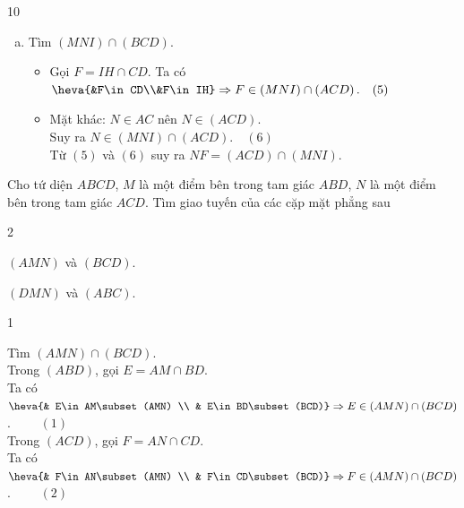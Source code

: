 \begin{indapan}{10}
\begin{bt}
{\begin{enumerate}[a)]
				\begin{itemize}
					\item Gọi $E=IH\cap BD$. Ta có $\heva{&E\in BD\\&E\in IH}\Rightarrow E\in \left(MNI\right)\cap\left(ABD\right).\quad (3)$
					\item Dễ thấy $M\in \left(ABD\right)\cap\left(MNI\right).\quad (4)$
				\end{itemize}
				Từ $(3)$ và $(4)$ suy ra $ME=\left(ABD\right)\cap\left(MNI\right)$.
		\item Tìm $(MNI) \cap (BCD)$.
			\begin{itemize}
				\item Gọi $F=IH\cap CD$. Ta có $\heva{&F\in CD\\&F\in IH}\Rightarrow F\in \left(MNI\right)\cap\left(ACD\right).\quad (5)$
				\item Mặt khác: $N\in AC$ nên $N\in \left(ACD\right)$.\\
				Suy ra $N\in \left(MNI\right)\cap\left(ACD\right).\quad (6)$\\
				Từ $(5)$ và $(6)$ suy ra $NF=\left(ACD\right)\cap\left(MNI\right)$.
			\end{itemize}
	\end{enumerate}
	}
\end{bt}
\begin{bt}%
	Cho tứ diện $ABCD$, $M$ là một điểm bên trong tam giác $ABD$, $N$ là một điểm bên trong tam giác $ACD$. Tìm giao tuyến của các cặp mặt phẳng sau
	\begin{enumEX}[]{2}
		\item $(AMN)$ và $(BCD)$.
		\item $(DMN)$ và $(ABC)$.
	\end{enumEX}
	\loigiai
	{
	\immini
	{
		\begin{enumEX}[a)]{1}
			\item Tìm $(AMN)\cap (BCD)$.\\
				Trong $(ABD)$, gọi $E=AM\cap BD$.\\
				Ta có $\heva{& E\in AM\subset (AMN) \\ & E\in BD\subset (BCD)}\Rightarrow E\in (AMN)\cap (BCD)$. $\qquad (1)$\\
				Trong $(ACD)$, gọi $F=AN\cap CD$.\\
				Ta có $\heva{& F\in AN\subset (AMN) \\ & F\in CD\subset (BCD)}\Rightarrow F\in (AMN)\cap (BCD)$. $\qquad (2)$\\

\end{enumEX}}}
\end{bt}
\end{indapan}
